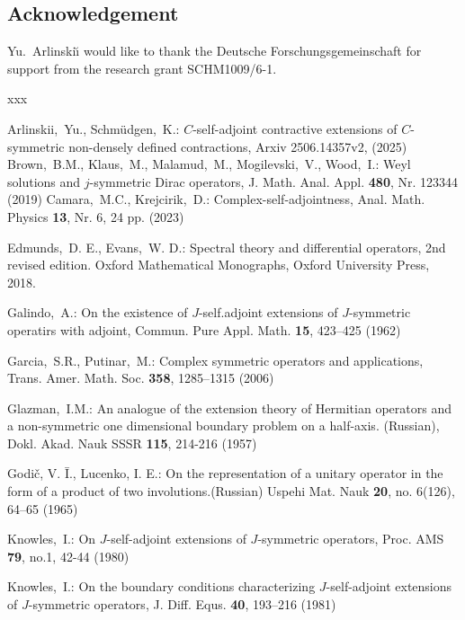\documentclass[12pt]{amsart}
\theoremstyle{definition}
\begin{document}
\smallskip

\subsection*{Acknowledgement}
 Yu.~Arlinski\u{\i} would like to thank  the Deutsche Forschungsgemeinschaft for support from the research grant SCHM1009/6-1.

\begin{thebibliography}{xxx}


Arlinskii,~Yu., Schm\"udgen,~K.: $C$-self-adjoint contractive extensions of $C$-symmetric non-densely defined contractions,  Arxiv 2506.14357v2, (2025)
Brown,~B.M., Klaus,~M., Malamud,~M., Mogilevski,~V., Wood,~I.: Weyl solutions and $j$-symmetric Dirac operators, J. Math. Anal. Appl.   \textbf{480}, Nr. 123344 (2019)
Camara,~M.C., Krejcirik,~D.: Complex-self-adjointness, Anal. Math. Physics   \textbf{13}, Nr. 6, 24 pp. (2023)


Edmunds,~D. E., Evans,~W. D.: Spectral theory and differential operators, 2nd revised edition.
Oxford Mathematical Monographs,  Oxford University Press,  2018.


Galindo,~A.: On the existence of $J$-self.adjoint extensions of $J$-symmetric operatirs with adjoint, Commun. Pure Appl. Math.   \textbf{15}, 423--425 (1962)



Garcia,~S.R., Putinar,~M.: Complex symmetric operators and applications, Trans. Amer. Math. Soc.  \textbf{358}, 1285--1315 (2006)

Glazman,~I.M.:
An analogue of the extension theory of Hermitian operators and a non-symmetric one dimensional boundary problem on a half-axis. (Russian),
Dokl. Akad. Nauk SSSR \textbf{115}, 214-216 (1957)


Godič, V. Ī., Lucenko, I. E.:
On the representation of a unitary operator in the form of a product of two involutions.(Russian)
Uspehi Mat. Nauk \textbf{20}, no. 6(126), 64–65  (1965)

Knowles,~I.: On $J$-self-adjoint extensions of $J$-symmetric operators, Proc. AMS \textbf{79}, no.1, 42-44 (1980)

Knowles,~I.: On the boundary conditions characterizing $J$-self-adjoint extensions of $J$-symmetric operators, J. Diff. Equs. \textbf{40}, 193--216 (1981)


\end{thebibliography}
\end{document}
